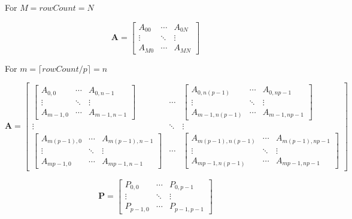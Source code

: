 \documentclass{article}
\begin{document}
For $M = rowCount = N$ 
	
\[
	\mathbf{A} = \left[
	\begin{array}{ccc}
		A_{00} & \cdots & A_{0N}\\
		\vdots & \ddots & \vdots\\
		A_{M0} & \cdots & A_{MN} 
	\end{array} 
	\right]
\]




For $m = \lceil rowCount/p \rceil = n$ 


\[
	\mathbf{A} = \left[
	\begin{array}{ccc}

	\left[
	\begin{array}{ccc}
	A_{0,0} & \cdots & A_{0,n-1}\\
	\vdots & \ddots & \vdots\\
	A_{m-1,0} & \cdots & A_{m-1,n-1} 
	\end{array} 
	\right]
	 & \cdots & 
	 \left[
	 \begin{array}{ccc}
	 A_{0,n(p-1)} & \cdots & A_{0,np-1}\\
	 \vdots & \ddots & \vdots\\
	 A_{m-1,n(p-1)} & \cdots & A_{m-1,np-1} 
	 \end{array} 
	 \right]
	 \\
	\vdots & \ddots & \vdots\\
		 \left[
	\begin{array}{ccc}
	A_{m(p-1),0} & \cdots & A_{m(p-1),n-1}\\
	\vdots & \ddots & \vdots\\
	A_{mp-1,0} & \cdots & A_{mp-1,n-1} 
	\end{array} 
	\right] & \cdots & 	 \left[
	\begin{array}{ccc}
	A_{m(p-1),n(p-1)} & \cdots & A_{m(p-1),np-1}\\
	\vdots & \ddots & \vdots\\
	A_{mp-1,n(p-1)} & \cdots & A_{mp-1,np-1} 
	\end{array} 
	\right] 
	\end{array} 
	\right]
\]


\[
\mathbf{P} = \left[
\begin{array}{ccc}
P_{0,0} & \cdots & P_{0,p-1}\\
\vdots & \ddots & \vdots\\
P_{p-1,0} & \cdots & P_{p-1,p-1} 
\end{array} 
\right]
\]
\end{document}
